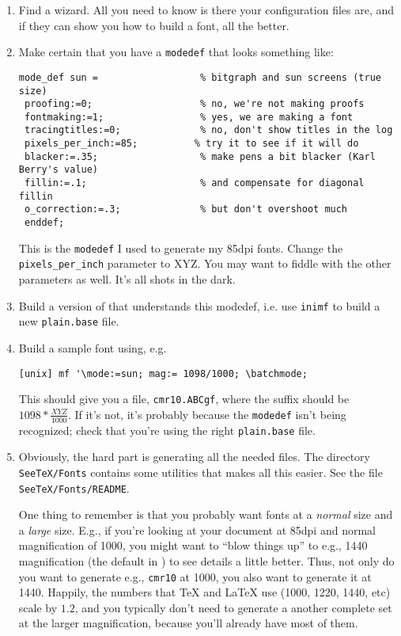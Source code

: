 \begin{enumerate}
\item Find a {\MetaFont} wizard. All you need to know is there your
	configuration files are, and if they can show you how to build
	a font, all the better.

\item Make certain that you have a \verb|modedef| that looks something like:
\begin{verbatim}
mode_def sun =                  % bitgraph and sun screens (true size)
 proofing:=0;                   % no, we're not making proofs
 fontmaking:=1;                 % yes, we are making a font
 tracingtitles:=0;              % no, don't show titles in the log
 pixels_per_inch:=85;          % try it to see if it will do
 blacker:=.35;                  % make pens a bit blacker (Karl Berry's value)
 fillin:=.1;                    % and compensate for diagonal fillin
 o_correction:=.3;              % but don't overshoot much
 enddef;
\end{verbatim}
%
This is the \verb|modedef| I used to generate my 85dpi fonts.
Change the \verb|pixels_per_inch| parameter to XYZ. You may want to fiddle
with the other parameters as well. It's all shots in the dark.

\item Build a version of {\MetaFont} that understands this modedef, 
	i.e. use {\tt inimf} to build a new {\tt plain.base} file.

\item Build a sample font using, e.g.

\begin{verbatim}
[unix] mf '\mode:=sun; mag:= 1098/1000; \batchmode; 
\end{verbatim}
%
This should give you a file, \verb|cmr10.ABCgf|, where the suffix
should be $1098 * \frac{XYZ}{1000}$. If it's not, it's probably because
the \verb|modedef| isn't being recognized; check that you're using the
right \verb|plain.base| file. 

\item
Obviously, the hard part is generating all the needed {\GF} files.
The directory \verb|SeeTeX/Fonts| contains some utilities
that makes all this easier. See the file \verb|SeeTeX/Fonts/README|.

One thing to remember is that you probably want fonts at a {\em normal}
size and a {\em large} size. E.g., if you're looking at your document
at 85dpi and normal magnification of 1000, you might want to ``blow things up''
to e.g., 1440 magnification (the default in {\xtex})
to see details a little better. Thus, not only do you
want to generate e.g., {\tt cmr10} at 1000, you also want to generate it
at 1440.
Happily, the numbers that {\TeX} and {\LaTeX} use (1000, 1220, 1440, etc)
scale by $1.2$, and you typically don't need to generate a another complete
set at the larger magnification, because you'll already have most of them.
\end{enumerate}

